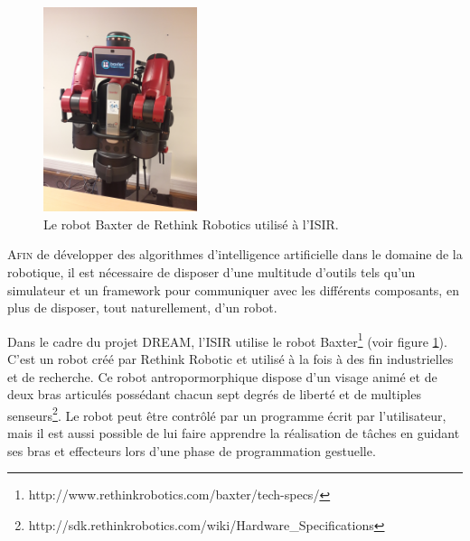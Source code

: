 \documentclass{llncs}
\begin{document}
\begin{figure}
  \begin{center}
    \includegraphics[angle=-90, width=0.4\textwidth]{figures/baxter}
  \end{center}
  \caption{Le robot Baxter de Rethink Robotics utilisé à l'ISIR.}
  \label{fig:baxter}
\end{figure}

\lettrine{A}{fin} de développer des algorithmes d'intelligence artificielle dans le domaine de la robotique, il est nécessaire de disposer d'une multitude d'outils tels qu'un simulateur et un framework pour communiquer avec les différents composants, en plus de disposer, tout naturellement, d'un robot.


Dans le cadre du projet DREAM, l'ISIR utilise le robot Baxter\footnote{http://www.rethinkrobotics.com/baxter/tech-specs/} (voir figure \ref{fig:baxter}).
C'est un robot créé par Rethink Robotic et utilisé à la fois à des fin industrielles et de recherche.
Ce robot antropormorphique dispose d'un \og{}visage animé\fg{} et de deux bras articulés possédant chacun sept degrés de liberté et de multiples senseurs\footnote{http://sdk.rethinkrobotics.com/wiki/Hardware\_Specifications}.
Le robot peut être contrôlé par un programme écrit par l'utilisateur, mais il est aussi possible de lui faire apprendre la réalisation de tâches en guidant ses bras et effecteurs lors d'une phase de programmation gestuelle.
\end{document}
